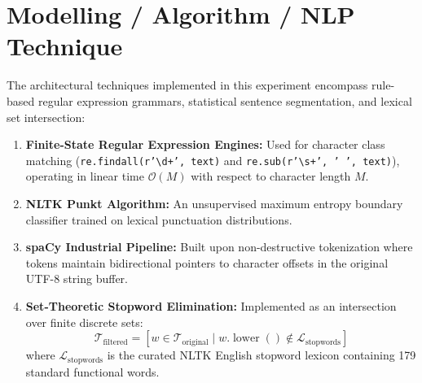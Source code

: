 \documentclass[12pt,a4paper]{report}
\begin{document}
\section{Modelling / Algorithm / NLP Technique}
The architectural techniques implemented in this experiment encompass rule-based regular expression grammars, statistical sentence segmentation, and lexical set intersection:
\begin{enumerate}
    \item \textbf{Finite-State Regular Expression Engines:} Used for character class matching (\texttt{re.findall(r'\textbackslash d+', text)} and \texttt{re.sub(r'\textbackslash s+', ' ', text)}), operating in linear time $\mathcal{O}(M)$ with respect to character length $M$.
    \item \textbf{NLTK Punkt Algorithm:} An unsupervised maximum entropy boundary classifier trained on lexical punctuation distributions.
    \item \textbf{spaCy Industrial Pipeline:} Built upon non-destructive tokenization where tokens maintain bidirectional pointers to character offsets in the original UTF-8 string buffer.
    \item \textbf{Set-Theoretic Stopword Elimination:} Implemented as an intersection over finite discrete sets:
    \begin{equation}
        \mathcal{T}_{\text{filtered}} = [w \in \mathcal{T}_{\text{original}} \mid w.\operatorname{lower}() \notin \mathcal{L}_{\text{stopwords}}]
    \end{equation}
    where $\mathcal{L}_{\text{stopwords}}$ is the curated NLTK English stopword lexicon containing 179 standard functional words.
\end{enumerate}
\end{document}
